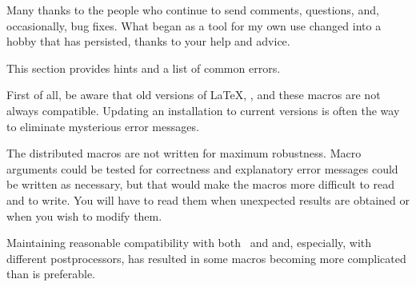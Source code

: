 Many thanks to the people who continue to send comments, questions,
and, occasionally, bug fixes. What began as a tool for my own use changed
into a hobby that has persisted, thanks to your help and advice.

This section provides hints and a list of common errors.

First of all, be aware that old versions of \LaTeX, \dpic, and these
macros are not always compatible.  Updating an installation to current
versions is often the way to eliminate mysterious error messages.

The distributed macros are not written for maximum robustness.
Macro arguments could be tested for correctness and
explanatory error messages could be written as necessary, but that
would make the macros more difficult to read and to write.  You will
have to read them when unexpected results are obtained or when you wish
to modify them.

Maintaining reasonable compatibility with both \gpic\ and \dpic
and, especially, with different postprocessors, has
resulted in some macros becoming more complicated than is preferable.

